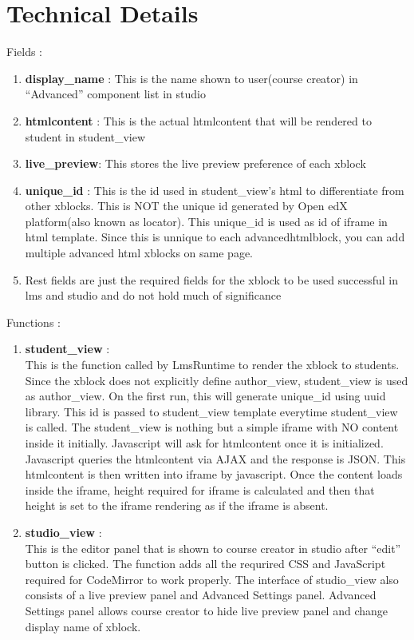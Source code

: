 \section{Technical Details}
Fields :
\begin{enumerate}
\item \textbf{display\_name} : This is the name shown to user(course creator) in “Advanced” component
list in studio
\item \textbf{htmlcontent} : This is the actual htmlcontent that will be rendered to student in student\_view
\item \textbf{live\_preview}: This stores the live preview preference of each xblock
\item \textbf{unique\_id} : This is the id used in student\_view’s html to differentiate from other xblocks.
This is NOT the unique id generated by Open edX platform(also known as locator). This
unique\_id is used as id of iframe in html template. Since this is unnique to each
advancedhtmlblock, you can add multiple advanced html xblocks on same page.
\item Rest fields are just the required fields for the xblock to be used successful in lms and studio
and do not hold much of significance
\end{enumerate}
Functions :
\begin{enumerate}
\item \textbf{student\_view} : \\
This is the function called by LmsRuntime to render the xblock to students.
Since the xblock does not explicitly define author\_view, student\_view is used as
author\_view. On the first run, this will generate unique\_id using uuid library. This id is
passed to student\_view template everytime student\_view is called. The student\_view is
nothing but a simple iframe with NO content inside it initially. Javascript will ask for
htmlcontent once it is initialized. Javascript queries the htmlcontent via AJAX and the
response is JSON. This htmlcontent is then written into iframe by javascript. Once the
content loads inside the iframe, height required for iframe is calculated and then that height
is set to the iframe rendering as if the iframe is absent.
\item \textbf{studio\_view} : \\
This is the editor panel that is shown to course creator in studio after “edit”
button is clicked. The function adds all the requrired CSS and JavaScript required for
CodeMirror to work properly. The interface of studio\_view also consists of a live preview
panel and Advanced Settings panel. Advanced Settings panel allows course creator to hide
live preview panel and change display name of xblock.
\end{enumerate}

